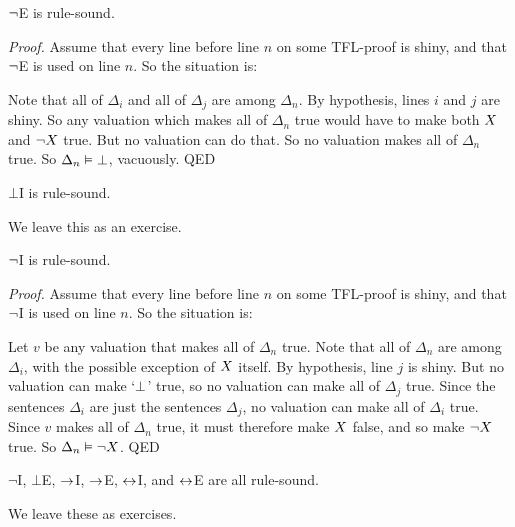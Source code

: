 \begin{highlighted}
	$\neg$E is rule-sound.
\end{highlighted}

\emph{Proof.}
	Assume that every line before line $n$ on some TFL-proof is shiny, and that $\neg$E is used on line $n$. So the situation is:
\begin{pf}
\end{pf}\noindent
Note that all of $\Delta_i$ and all of $\Delta_j$ are among $\Delta_{n}$. By hypothesis, lines $i$ and $j$ are shiny. So any valuation which makes all of $\Delta_{n}$ true would have to make both $X$ and $\neg X$ true. But no valuation can do that. So no valuation makes all of $\Delta_{n}$ true. So $\Delta_{n} \vDash \bot$, vacuously.
QED

\begin{highlighted}
	$\bot$I is rule-sound.
\end{highlighted}

We leave this as an exercise.

\begin{highlighted}
	$\neg$I is rule-sound.
\end{highlighted}

\emph{Proof.}
	Assume that every line before line $n$ on some TFL-proof is shiny, and that $\neg$I is used on line $n$. So the situation is:
\begin{pf}
   \open
   \close
\end{pf}\noindent
Let $v$ be any valuation that makes all of $\Delta_{n}$ true. Note that all of $\Delta_{n}$ are among $\Delta_i$, with the possible exception of $X$ itself. By hypothesis, line $j$ is shiny. But no valuation can make `$\bot$' true, so no valuation can make all of $\Delta_{j}$ true. Since the sentences $\Delta_i$ are just the sentences $\Delta_{j}$, no valuation can make all of $\Delta_i$ true. Since $v$ makes all of $\Delta_{n}$ true, it must therefore make $X$ false, and so make $\neg X$ true. So $\Delta_n \vDash \neg X$.
QED


\begin{highlighted}\label{lem:LastRuleSound} $\neg$I, $\bot$E, $\rightarrow$I,  $\rightarrow$E, $\leftrightarrow$I, and $\leftrightarrow$E are all rule-sound.
\end{highlighted}

We leave these as exercises.

